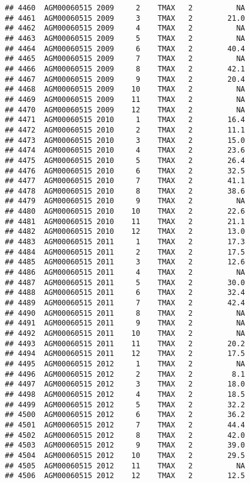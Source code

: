 \documentclass{article}\usepackage[]{graphicx}\usepackage[]{color}
\makeatletter
\newenvironment{kframe}{%
 \def\at@end@of@kframe{}%
 \ifinner\ifhmode%
  \def\at@end@of@kframe{\end{minipage}}%
  \begin{minipage}{\columnwidth}%
 \fi\fi%
 \def\FrameCommand##1{\hskip\@totalleftmargin \hskip-\fboxsep
 \colorbox{shadecolor}{##1}\hskip-\fboxsep
     \hskip-\linewidth \hskip-\@totalleftmargin \hskip\columnwidth}%
 \MakeFramed {\advance\hsize-\width
   \@totalleftmargin\z@ \linewidth\hsize
   \@setminipage}}%
 {\par\unskip\endMakeFramed%
 \at@end@of@kframe}
\newenvironment{knitrout}{}{} %
\makeatother
\begin{document}
\begin{knitrout}
\begin{kframe}
\begin{verbatim}
## 4460  AGM00060515 2009     2    TMAX   2          NA
## 4461  AGM00060515 2009     3    TMAX   2        21.0
## 4462  AGM00060515 2009     4    TMAX   2          NA
## 4463  AGM00060515 2009     5    TMAX   2          NA
## 4464  AGM00060515 2009     6    TMAX   2        40.4
## 4465  AGM00060515 2009     7    TMAX   2          NA
## 4466  AGM00060515 2009     8    TMAX   2        42.1
## 4467  AGM00060515 2009     9    TMAX   2        20.4
## 4468  AGM00060515 2009    10    TMAX   2          NA
## 4469  AGM00060515 2009    11    TMAX   2          NA
## 4470  AGM00060515 2009    12    TMAX   2          NA
## 4471  AGM00060515 2010     1    TMAX   2        16.4
## 4472  AGM00060515 2010     2    TMAX   2        11.1
## 4473  AGM00060515 2010     3    TMAX   2        15.0
## 4474  AGM00060515 2010     4    TMAX   2        23.6
## 4475  AGM00060515 2010     5    TMAX   2        26.4
## 4476  AGM00060515 2010     6    TMAX   2        32.5
## 4477  AGM00060515 2010     7    TMAX   2        41.1
## 4478  AGM00060515 2010     8    TMAX   2        38.6
## 4479  AGM00060515 2010     9    TMAX   2          NA
## 4480  AGM00060515 2010    10    TMAX   2        22.6
## 4481  AGM00060515 2010    11    TMAX   2        21.1
## 4482  AGM00060515 2010    12    TMAX   2        13.0
## 4483  AGM00060515 2011     1    TMAX   2        17.3
## 4484  AGM00060515 2011     2    TMAX   2        17.5
## 4485  AGM00060515 2011     3    TMAX   2        12.6
## 4486  AGM00060515 2011     4    TMAX   2          NA
## 4487  AGM00060515 2011     5    TMAX   2        30.0
## 4488  AGM00060515 2011     6    TMAX   2        32.4
## 4489  AGM00060515 2011     7    TMAX   2        42.4
## 4490  AGM00060515 2011     8    TMAX   2          NA
## 4491  AGM00060515 2011     9    TMAX   2          NA
## 4492  AGM00060515 2011    10    TMAX   2          NA
## 4493  AGM00060515 2011    11    TMAX   2        20.2
## 4494  AGM00060515 2011    12    TMAX   2        17.5
## 4495  AGM00060515 2012     1    TMAX   2          NA
## 4496  AGM00060515 2012     2    TMAX   2         8.1
## 4497  AGM00060515 2012     3    TMAX   2        18.0
## 4498  AGM00060515 2012     4    TMAX   2        18.5
## 4499  AGM00060515 2012     5    TMAX   2        32.2
## 4500  AGM00060515 2012     6    TMAX   2        36.2
## 4501  AGM00060515 2012     7    TMAX   2        44.4
## 4502  AGM00060515 2012     8    TMAX   2        42.0
## 4503  AGM00060515 2012     9    TMAX   2        39.0
## 4504  AGM00060515 2012    10    TMAX   2        29.5
## 4505  AGM00060515 2012    11    TMAX   2          NA
## 4506  AGM00060515 2012    12    TMAX   2        12.5

\end{verbatim}
\end{kframe}
\end{knitrout}
\end{document}
